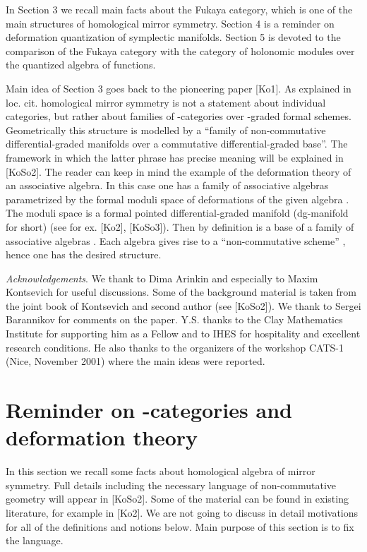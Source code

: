 \documentclass[a4paper,12pt]{article}
\begin{document}
In Section 3 we recall main facts about the Fukaya category,
which is one of the main structures of homological mirror
symmetry. Section 4 is a reminder on deformation quantization
of symplectic manifolds.
Section 5 is devoted to
the comparison of the Fukaya category with the category of
holonomic modules over the quantized algebra of functions.

Main idea of Section 3 goes back to the pioneering paper [Ko1]. As explained in loc. cit.
homological mirror symmetry is not a statement about
individual categories, but rather  about families of \myHighlight{$\A$}\coordHE{}-categories
over  \myHighlight{$\Z$}\coordHE{}-graded formal schemes.
Geometrically this structure is modelled by a ``family
of non-commutative differential-graded manifolds over a
commutative differential-graded base''. The framework in
which the latter phrase has precise meaning will be explained
in [KoSo2]. The reader can keep in mind the example of the
deformation theory of an associative
algebra. In this case
one has a family of associative algebras parametrized by the formal moduli space
\coordHE{} of deformations of the given algebra \coordHE{}. 
The moduli space \coordHE{}
is a formal pointed differential-graded manifold (dg-manifold for short)
 (see for ex. [Ko2], [KoSo3]).
Then by definition \coordHE{} is a base of a family of associative algebras
\coordHE{}. Each algebra gives rise to
a ``non-commutative scheme'' \coordHE{}, hence one has the
desired structure.

{\it Acknowledgements}. We thank to Dima Arinkin and
especially to Maxim Kontsevich for useful
discussions. 
Some of the background material is taken from
the joint book of Kontsevich and second author (see [KoSo2]).
 We thank to Sergei Barannikov 
for comments on the paper.
Y.S. thanks to the Clay Mathematics Institute for
supporting him as a Fellow and to IHES for hospitality
and excellent research conditions. He also thanks to the organizers
of the workshop CATS-1 (Nice, November 2001) where the main 
ideas were reported.

\section{Reminder on \myHighlight{$\A$}\coordHE{}-categories and deformation theory}

In this section we recall some facts about homological algebra of
mirror symmetry. Full details including the
necessary language of non-commutative geometry will appear in [KoSo2].
Some of the material can be found in existing literature,
for example in [Ko2]. We are not going to discuss in detail  motivations 
for all of the definitions and notions below.
Main purpose of this section is to fix the language. 
\end{document}
